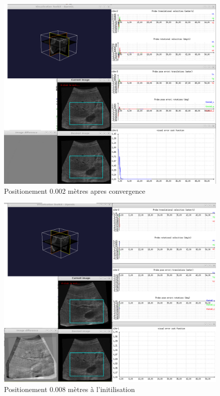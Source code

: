 \documentclass[a4paper,11pt]{article}
\begin{document}
\begin{figure}[H]
    \centering
    \includegraphics[width=0.5\textheight]{./images/q13_0,002_end.png}
    \caption{ Positionement 0.002 m\`etres apres convergence }
    \label{q13_2}
\end{figure}
\begin{figure}[H]
    \centering
    \includegraphics[width=0.5\textheight]{./images/q13_0,008_begin.png}
    \caption{ Positionement 0.008 m\`etres \`a l'initilisation }
    \label{q13_3}
\end{figure}
\end{document}
